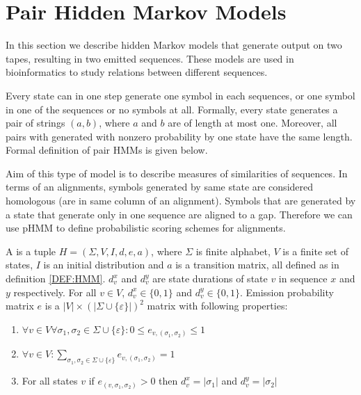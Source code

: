 \section{Pair Hidden Markov Models}\label{SECTION:PAIRHMM}

In this section we  describe hidden Markov models that generate output on
two tapes, resulting in two emitted sequences. These models are used in
bioinformatics to study relations between different sequences.

Every state can in one step generate one symbol in each sequences, or one symbol
in one of the sequences or no symbols at all.
Formally, every state generates a pair of strings $(a,b)$, where $a$
and $b$ are of length at most one.
Moreover, all pairs with generated with nonzero probability by one state have
the same length.  Formal definition of pair HMMs is given below.

Aim of this type of model is to describe measures of similarities of sequences.
In terms of an alignments, symbols generated by same state are considered
homologous (are in same column of an alignment). Symbols that are generated by a
state that generate  only in one sequence are aligned to a gap. Therefore we can
use pHMM to define probabilistic scoring schemes for alignments.


\begin{definition}
A  is a tuple $H=(\Sigma,V,I,d,e,a)$, where $\Sigma$ is finite
alphabet, $V$ is a finite set of states, $I$ is an initial distribution and $a$ is
a transition matrix, all defined as
in definition \ref{DEF:HMM}. $d^x_v$ and $d^y_v$ are state durations of state $v$
in sequence $x$ and $y$ respectively. For all $v\in V$,
$d^x_v\in \{0,1\}$ and $d^y_v\in \{0,1\}$.
Emission probability matrix $e$ is
a $|V|\times\left(|\Sigma\cup\{\varepsilon\}|\right)^2$ matrix with following
properties:
\def\lala#1{\{#1\}}
\begin{enumerate}
\item
$\forall v\in V\forall \sigma_1,\sigma_2\in\Sigma\cup\{\varepsilon\}:
0\leq e_{v,(\sigma_1,\sigma_2)}\leq 1$

\item 
$\forall v\in V:
\sum_{\sigma_1,\sigma_2\in\Sigma\cup \lala{\varepsilon }}e_{v,(\sigma_1,\sigma_2)} = 1$

\item For all states $v$ if $e_{(v,\sigma_1,\sigma_2)}>0$ then
$d^x_v=|\sigma_1|$ and $d^y_v=|\sigma_2|$
\end{enumerate}

\end{definition}

